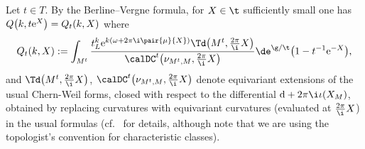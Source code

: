 Let $t \in T$. By the Berline--Vergne formula, for $X \in \t$ sufficiently small one has $Q\big(k,t{\rm e}^X\big)=Q_t(k,X)$ where
\begin{gather}\label{eqn:BerVer}
Q_t(k,X):=\int_{M^t} \frac{t_L^k {\rm e}^{k(\omega+2\pi \i\pair{\mu}{X})}\Td\big(M^t,\tfrac{2\pi}{\i}X\big)}{\calDC^t\big(\nu_{M^t,M},\tfrac{2\pi}{\i}X\big)}\de^{\g/\t}\big(1-t^{-1}{\rm e}^{-X}\big),
\end{gather}
and $\Td\big(M^t,\tfrac{2\pi}{\i}X\big)$, $\calDC^t\big(\nu_{M^t,M},\tfrac{2\pi}{\i}X\big)$ denote equivariant extensions of the usual Chern-Weil forms, closed with respect to the differential ${\rm d}+2\pi \i \iota(X_M)$, obtained by replacing curvatures with equivariant curvatures (evaluated at $\tfrac{2\pi}{\i}X$) in the usual formulas (cf.~\cite{BerlineGetzlerVergne} for details, although note that we are using the topologist's convention for characteristic classes).

